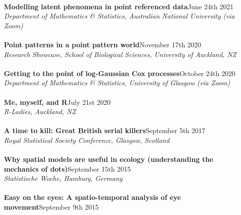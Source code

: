 \documentclass[10pt,letter]{article}
\begin{document}
       \hdashrule[0.5ex]{4cm}{1pt}{1pt}\\
       {\textbf{Modelling latent phenomena in point referenced data}}\hfill June 24th 2021\\
       {\sl Department of Mathematics \& Statistics, Australian National University (via Zoom)}\\
       \hdashrule[0.5ex]{4cm}{1pt}{1pt}\\
                 {\textbf{Point patterns in a point pattern world}}\hfill November 17th 2020\\
                 {\sl Research Showcase, School of Biological Sciences, University of Auckland, NZ}\\
                 \hdashrule[0.5ex]{4cm}{1pt}{1pt}\\
                           {\textbf{Getting to the point of log-Gaussian Cox processes}}\hfill October 24th 2020\\
                           {\sl Department of Mathematics \& Statistics, University of Glasgow (via Zoom)}\\
                           \hdashrule[0.5ex]{4cm}{1pt}{1pt}\\
                                     {\textbf{Me, myself, and R}}\hfill July 21st 2020\\
                                     {\sl R-Ladies, Auckland, NZ}\\
                                     \hdashrule[0.5ex]{4cm}{1pt}{1pt}\\
                                     \textbf{A time to kill: Great British serial killers}\hfill  September 5th 2017\\
                                            {\sl Royal Statistical Society Conference, Glasgow, Scotland}\\
                                            \hdashrule[0.5ex]{4cm}{1pt}{1pt}\\
                                            \textbf{Why spatial models are useful in ecology (understanding the \\
                                              mechanics of dots)}\hfill September 15th 2015\\
                                                   {\sl Statistische Woche, Hamburg, Germany}\\
                                                   \hdashrule[0.5ex]{4cm}{1pt}{1pt}\\
                                                   \textbf{Easy on the eyes: A spatio-temporal analysis of eye movement}\hfill September 9th 2015\\
\end{document}

